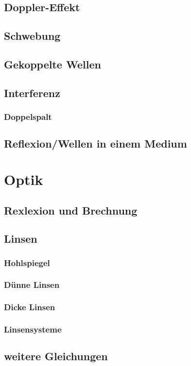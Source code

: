 \documentclass[german, 8pt]{latex4ei/latex4ei_sheet}
\begin{document}
\subsection{Doppler-Effekt}
\subsection{Schwebung}
\subsection{Gekoppelte Wellen}
\subsection{Interferenz}
\subsubsection{Doppelspalt}
\subsection{Reflexion/Wellen in einem Medium}

\section{Optik}
\subsection{Rexlexion und Brechnung}
\subsection{Linsen}
\subsubsection{Hohlspiegel}
\subsubsection{Dünne Linsen}
\subsubsection{Dicke Linsen}
\subsubsection{Linsensysteme}
\subsection{weitere Gleichungen}
\end{document}
